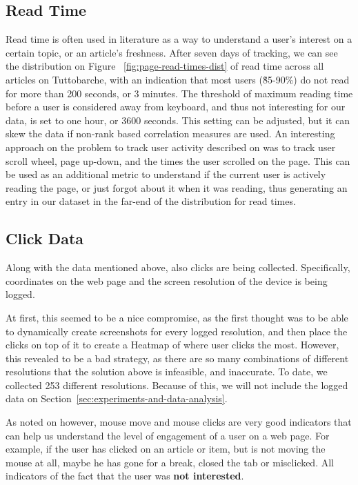 \documentclass[sigconf,nonacm]{acmart}
\begin{document}
\subsection{Read Time}

Read time is often used in literature \cite{hu2008collaborative, liu2010personalized, chaturvedi2017}
as a way to understand a user's interest on a certain topic, or an article's freshness.
After seven days of tracking, we can see the distribution on Figure
~\ref{fig:page-read-times-dist} of read time across all articles on Tuttobarche,
with an indication that most users (\~85-90\%) do not read for more than 200 seconds,
or 3 minutes.
The threshold of maximum reading time before a user is considered away from keyboard,
and thus not interesting for our data, is set to one hour, or 3600 seconds. This
setting can be adjusted, but it can skew the data if non-rank based correlation
measures are used. An interesting approach on the problem to track user
activity described on \cite{chaturvedi2017} was to track user scroll wheel, page
up-down, and the times the user scrolled on the page. This can be used as an
additional metric to understand if the current user is actively reading the
page, or just forgot about it when it was reading, thus generating an entry in
our dataset in the far-end of the distribution for read times.

\subsection{Click Data}
\label{sec:click-data}

Along with the data mentioned above, also clicks are being collected.
Specifically, coordinates on the web page and the screen resolution of the
device is being logged.

At first, this seemed to be a nice compromise, as the first thought was to be
able to dynamically create screenshots for every logged resolution, and then
place the clicks on top of it to create a Heatmap of where user clicks the most.
However, this revealed to be a bad strategy, as there are so many combinations
of different resolutions that the solution above is infeasible, and inaccurate.
To date, we collected 253 different resolutions. Because of this, we will not
include the logged data on Section~\ref{sec:experiments-and-data-analysis}.

As noted on \cite{kim2005implicit} however, mouse move and mouse clicks are very
good indicators that can help us understand the level of engagement of a user on
a web page. For example, if the user has clicked on an article or item, but is
not moving the mouse at all, maybe he has gone for a break, closed the tab or
misclicked. All indicators of the fact that the user was \textbf{not interested}.
\end{document}
